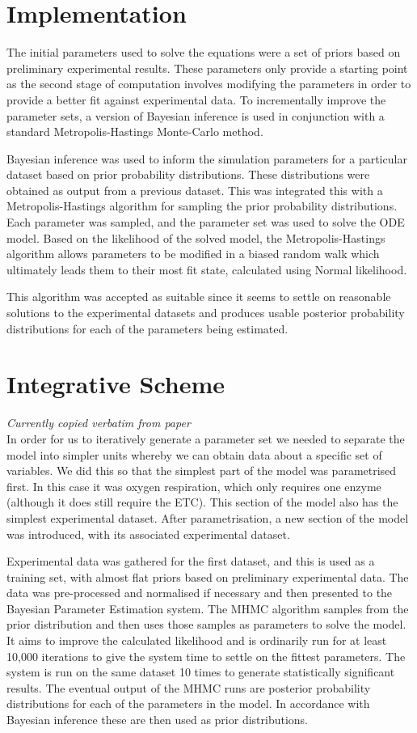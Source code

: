 \section{Implementation}
The initial parameters used to solve the equations were a set of priors based on preliminary experimental results. These parameters only provide a starting point as the second stage of computation involves modifying the parameters in order to provide a better fit against experimental data. To incrementally improve the parameter sets, a version of Bayesian inference is used in conjunction with a standard Metropolis-Hastings Monte-Carlo method.

Bayesian inference was used to inform the simulation parameters for a particular dataset based on prior probability distributions. These distributions were obtained as output from a previous dataset. This was integrated this with a Metropolis-Hastings algorithm for sampling the prior probability distributions. Each parameter was sampled, and the parameter set was used to solve the ODE model. Based on the likelihood of the solved model, the Metropolis-Hastings algorithm allows parameters to be modified in a biased random walk which ultimately leads them to their most fit state, calculated using Normal likelihood.

This algorithm was accepted as suitable since it seems to settle on reasonable solutions to the experimental datasets and produces usable posterior probability distributions for each of the parameters being estimated.

\section{Integrative Scheme}
\emph{Currently copied verbatim from paper}\\
In order for us to iteratively generate a parameter set we needed to separate the model into simpler units whereby we can obtain data about a specific set of variables. We did this so that the simplest part of the model was parametrised first. In this case it was oxygen respiration, which only requires one enzyme (although it does still require the ETC). This section of the model also has the simplest experimental dataset. After parametrisation, a new section of the model was introduced, with its associated experimental dataset.

Experimental data was gathered for the first dataset, and this is used as a training set, with almost flat priors based on preliminary experimental data. The data was pre-processed and normalised if necessary and then presented to the Bayesian Parameter Estimation system. The MHMC algorithm samples from the prior distribution and then uses those samples as parameters to solve the model. It aims to improve the calculated likelihood and is ordinarily run for at least 10,000 iterations to give the system time to settle on the fittest parameters. The system is run on the same dataset 10 times to generate statistically significant results. The eventual output of the MHMC runs are posterior probability distributions for each of the parameters in the model. In accordance with Bayesian inference these are then used as prior distributions.

